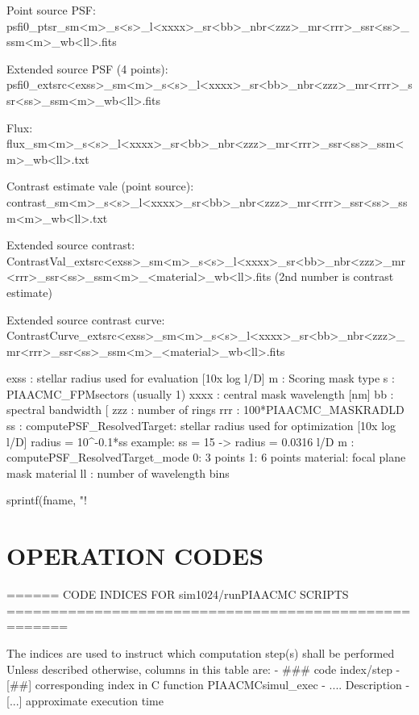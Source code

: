 \begin{DoxyVerb}
\begin{DoxyVerb}
\begin{DoxyVerb}Point source PSF:
psfi0_ptsr_sm<m>_s<s>_l<xxxx>_sr<bb>_nbr<zzz>_mr<rrr>_ssr<ss>_ssm<m>_wb<ll>.fits

Extended source PSF (4 points):
psfi0_extsrc<exss>_sm<m>_s<s>_l<xxxx>_sr<bb>_nbr<zzz>_mr<rrr>_ssr<ss>_ssm<m>_wb<ll>.fits

Flux: 
flux_sm<m>_s<s>_l<xxxx>_sr<bb>_nbr<zzz>_mr<rrr>_ssr<ss>_ssm<m>_wb<ll>.txt

Contrast estimate vale (point source):
contrast_sm<m>_s<s>_l<xxxx>_sr<bb>_nbr<zzz>_mr<rrr>_ssr<ss>_ssm<m>_wb<ll>.txt

Extended source contrast:
ContrastVal_extsrc<exss>_sm<m>_s<s>_l<xxxx>_sr<bb>_nbr<zzz>_mr<rrr>_ssr<ss>_ssm<m>_<material>_wb<ll>.fits
(2nd number is contrast estimate)

Extended source contrast curve:
ContrastCurve_extsrc<exss>_sm<m>_s<s>_l<xxxx>_sr<bb>_nbr<zzz>_mr<rrr>_ssr<ss>_ssm<m>_<material>_wb<ll>.fits


exss : stellar radius used for evaluation  [10x log l/D]
m    : Scoring mask type
s    : PIAACMC_FPMsectors (usually 1)
xxxx : central mask wavelength [nm]
bb   : spectral bandwidth [%
zzz  : number of rings
rrr  : 100*PIAACMC_MASKRADLD
ss   : computePSF_ResolvedTarget: stellar radius used for optimization  [10x log l/D]
    radius = 10^{-0.1*ss}
    example: ss = 15  ->  radius = 0.0316 l/D
m    : computePSF_ResolvedTarget_mode
    0: 3 points
    1: 6 points
material: focal plane mask material
ll   : number of wavelength bins


sprintf(fname, "!%
\end{DoxyVerb}


\section*{O\+P\+E\+R\+A\+T\+I\+O\+N C\+O\+D\+E\+S}

\begin{DoxyVerb}====== CODE INDICES FOR sim1024/runPIAACMC SCRIPTS =====================================================

The indices are used to instruct which computation step(s) shall be performed
Unless described otherwise, columns in this table are:
- ###     code index/step
- [##]   corresponding index in C function PIAACMCsimul_exec
- ....   Description
- [...]  approximate execution time







\end{DoxyVerb}
\end{DoxyVerb}
\end{DoxyVerb}
